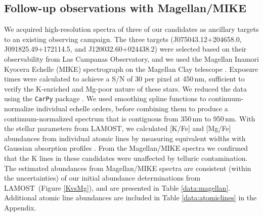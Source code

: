 \documentclass[a4paper,fleqn,usenatbib]{mnras}
\newcommand{\project}[1]{#1}
\newcommand{\lamost}{\project{LAMOST}}
\begin{document}
\subsection{Follow-up observations with Magellan/MIKE}
We acquired high-resolution spectra of three of our candidates as ancillary targets to an existing observing campaign. The three targets (J075043.12+204658.0, J091825.49+172114.5, and J120032.60+024438.2) were selected based on their observability from Las Campanas Observatory, and we used the Magellan Inamori Kyocera Echelle (MIKE) spectrograph on the Magellan Clay telescope \citep{shectman2003magellan,bernstein2003mike}. Exposure times were calculated to achieve a S/N of 30 per pixel at 450\,nm, sufficient to verify the K-enriched and Mg-poor nature of these stars. We reduced the data using the \texttt{CarPy} package \citep{kelson2003}. We used smoothing spline functions to continuum-normalize individual echelle orders, before combining them to produce a continuum-normalized spectrum that is contiguous from 350\,nm to 950\,nm. With the stellar parameters from \lamost, we calculated [K/Fe] and [Mg/Fe] abundances from individual atomic lines by measuring equivalent widths with Gaussian absorption profiles \citep{castelli2004,sneden,casey2014}. From the Magellan/MIKE spectra we confirmed that the K lines in these candidates were unaffected by telluric contamination. The estimated abundances from Magellan/MIKE spectra are consistent (within the uncertainties) of our initial abundance determinations from \lamost\ (Figure \ref{KvsMg}), and are presented in Table \ref{data:magellan}. Additional atomic line abundances are included in Table \ref{data:atomiclines} in the Appendix.
\end{document}
